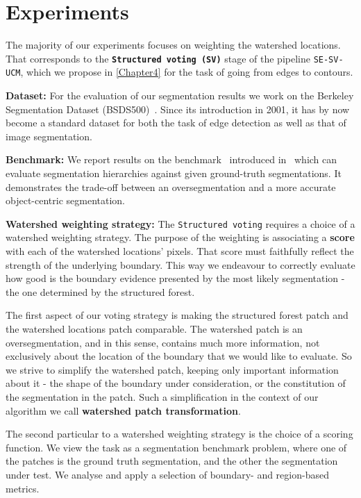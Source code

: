\chapter{Experiments}
\label{Chapter5}
The majority of our experiments focuses on weighting the watershed locations. That corresponds to the \textbf{\texttt{Structured voting (SV)}} stage of the pipeline {\tt SE-SV-UCM}, which we propose in \cref{Chapter4} for the task of going from edges to contours.

\textbf{Dataset:} For the evaluation of our segmentation results we work on the Berkeley Segmentation Dataset (BSDS500)~\cite{Arbelaez11}. Since its introduction in 2001, it has by now become a standard dataset for both the task of edge detection as well as that of image segmentation.

\textbf{Benchmark:} We report results on the benchmark~\cite{Galasso13Benchmark} introduced in~\cite{Galasso13} which can evaluate segmentation hierarchies against given ground-truth segmentations. It demonstrates the trade-off between an oversegmentation and a more accurate object-centric segmentation.

\textbf{Watershed weighting strategy:} The {\tt Structured voting} requires a choice of a watershed weighting strategy. The purpose of the weighting is associating a \textbf{score} with each of the watershed locations' pixels. That score must faithfully reflect the strength of the underlying boundary. This way we endeavour %
to correctly evaluate how good is the boundary evidence presented by the most likely segmentation - the one determined by the structured forest. 

The first aspect of our voting strategy is making the structured forest patch and the watershed locations patch comparable. The watershed patch is an oversegmentation, and in this sense, contains much more information, not exclusively about the location of the boundary that we would like to evaluate. So we strive to simplify the watershed patch, keeping only important information about it - the shape of the boundary under consideration, or the constitution of the segmentation in the patch. Such a simplification in the context of our algorithm we call {\bf watershed patch transformation}. %

The second particular to a watershed weighting strategy is the choice of a scoring function. We view the task as a segmentation benchmark problem, where one of the patches is the ground truth segmentation, and the other the segmentation under test. We analyse and apply a selection of boundary- and region-based metrics.

